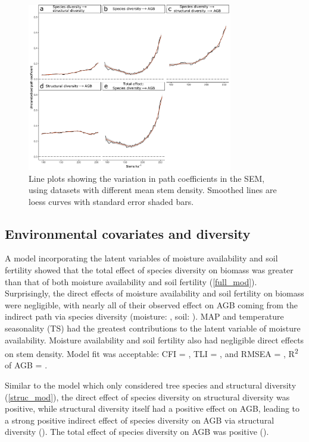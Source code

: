 \documentclass[11pt,a4paper]{article}
\begin{document}
\begin{figure}[H]
\centering
	\includegraphics[width=0.8\textwidth]{sem_struc_stems_ha}
	\caption{Line plots showing the variation in path coefficients in the SEM, using datasets with different mean stem density. Smoothed lines are loess curves with standard error shaded bars.}
	\label{sem_struc_stems_ha}
\end{figure}

\subsection*{Environmental covariates and diversity}

A model incorporating the latent variables of moisture availability and soil fertility showed that the total effect of species diversity on biomass was greater than that of both moisture availability and soil fertility (\autoref{full_mod}). Surprisingly, the direct effects of moisture availability and soil fertility on biomass were negligible, with nearly all of their observed effect on AGB coming from the indirect path via species diversity (moisture: \rgmbd{}, soil: \rgsbd{}). MAP and temperature seasonality (TS) had the greatest contributions to the latent variable of moisture availability. Moisture availability and soil fertility also had negligible direct effects on stem density.  Model fit was acceptable: CFI = \fmcfi{}, TLI = \fmtli{}, and RMSEA = \fmrmsea{}, R\textsuperscript{2} of AGB = \fmrsq{}.

Similar to the model which only considered tree species and structural diversity (\autoref{struc_mod}), the direct effect of species diversity on structural diversity was positive, while structural diversity itself had a positive effect on AGB, leading to a strong positive indirect effect of species diversity on AGB via structural diversity (\rgbhd{}). The total effect of species diversity on AGB was positive (\rgbd{}).
\end{document}
